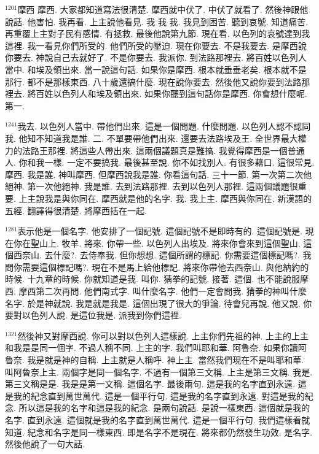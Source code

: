\documentclass{book}
\begin{document}
$^{1201}$摩西 摩西.
大家都知道寫法很清楚.
摩西就中伏了.
中伏了就看了.
然後神跟他說話.
他害怕.
我再看.
上主說他看見.
我 我 我.
我見到困苦.
聽到哀號.
知道痛苦.
再重覆上主對子民有感情.
有拯救.
最後他說第九節.
現在看.
以色列的哀號達到我這裡.
我一看見你們所受的.
他們所受的壓迫.
現在你要去.
不是我要去.
是摩西說你要去.
神說自己去就好了.
不是你要去.
我派你.
到法路那裡去.
將百姓以色列人當中.
和埃及領出來.
當一說這句話.
如果你是摩西.
根本就垂垂老矣.
根本就不是那行.
都不是那樣東西.
八十歲還搞什麼.
現在說你要去.
然後他又說你要到法路那裡去.
將百姓以色列人和埃及領出來.
如果你聽到這句話你是摩西.
你會想什麼呢.
第一.

$^{1241}$我去.
以色列人當中.
帶他們出來.
這是一個問題.
什麼問題.
以色列人認不認同我.
他知不知道我是誰.
二.
不單要帶他們出來.
還要去法路埃及王.
全世界最大權力的法路王那裡.
將這些人帶出來.
這兩個議題真是難搞.
我覺得摩西是一個普通人.
你和我一樣.
一定不要搞我.
最後甚至說.
你不如找別人.
有很多藉口.
這很常見.
摩西.
我是誰.
神叫摩西.
但摩西說我是誰.
你看這句話.
三十一節.
第一次第二次他絕神.
第一次他絕神.
我是誰.
去到法路那裡.
去到以色列人那裡.
這兩個議題很重要.
上主說我是與你同在.
摩西就是他的名字.
我.
我上主.
摩西與你同在.
新漢語的五經.
翻譯得很清楚.
將摩西括在一起.

$^{1281}$表示他是一個名字.
他安排了一個記號.
這個記號不是即時有的.
這個記號是.
現在你在聖山上.
牧羊.
將來.
你帶一些.
以色列人出埃及.
將來你會來到這個聖山.
這個西奈山.
去什麼?.
去侍奉我.
但你想想.
這個所謂的標記.
你需要這個標記嗎?.
我問你需要這個標記嗎?.
現在不是馬上給他標記.
將來你帶他去西奈山.
與他納約的時候.
十九章的時候.
你就知道是我.
叫你.
猜拳的記號.
接著.
這個.
也不能說服摩西.
摩西第二次再問.
他們南式字.
叫什麼名字.
他們一定會問我.
猜拳的神叫什麼名字.
於是神就說.
我是就是我是.
這個出現了很大的爭論.
待會兒再說.
他又說.
你要對以色列人說.
是這位我是.
派我到你們這裡.

$^{1321}$然後神又對摩西說.
你可以對以色列人這樣說.
上主你們先祖的神.
上主的上主和我是是同一個字.
不過人稱不同.
上主的字.
我們叫耶和華.
阿魯奈.
如果你讀阿魯奈.
我是就是神的自稱.
上主就是人稱呼.
神上主.
當然我們現在不是叫耶和華.
叫阿魯奈上主.
兩個字是同一個名字.
不過有一個第三文稱.
上主是第三文稱.
我是.
第三文稱是是.
我是是第一文稱.
這個名字.
最後兩句.
這是我的名字直到永遠.
這是我的紀念直到萬世萬代.
這是一個平行句.
這是我的名字直到永遠.
對這是我的紀念.
所以這是我的名字和這是我的紀念.
是兩句說話.
是說一樣東西.
這個就是我的名字.
直到永遠.
這個就是我的名字直到萬世萬代.
這是一個平行句.
我們這樣看就知道.
紀念和名字是同一樣東西.
即是名字不是現在.
將來都仍然發生功效.
是名字.
然後他說了一句大話.
\end{document}
